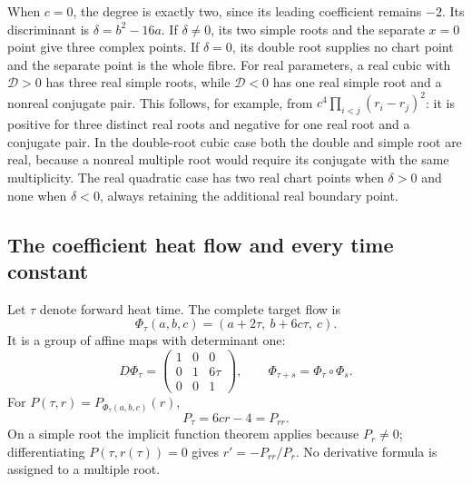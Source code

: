 When $c=0$, the degree is exactly two, since its leading coefficient
remains $-2$. Its discriminant is $\delta=b^2-16a$.
If $\delta\ne0$, its two simple roots and the separate $x=0$ point
give three complex points. If $\delta=0$, its double root supplies no
chart point and the separate point is the whole fibre.
For real parameters, a real cubic with $\mathscr D>0$ has three real
simple roots, while $\mathscr D<0$ has one real simple root and a
nonreal conjugate pair. This follows, for example, from
$c^4\prod_{i<j}(r_i-r_j)^2$: it is positive for three distinct real
roots and negative for one real root and a conjugate pair.
In the double-root cubic case both the double and simple root are real,
because a nonreal multiple root would require its conjugate with the
same multiplicity. The real quadratic case has two real chart points
when $\delta>0$ and none when $\delta<0$, always retaining the additional
real boundary point.

\subsection{The coefficient heat flow and every time constant}

Let $\tau$ denote forward heat time. The complete target flow is
\begin{equation}
 \Phi_\tau(a,b,c)=(a+2\tau,\ b+6c\tau,\ c).
 \label{eq:ifh-target-flow}
\end{equation}
It is a group of affine maps with determinant one:
\[
 D\Phi_\tau=
 \begin{pmatrix}1&0&0\\0&1&6\tau\\0&0&1\end{pmatrix},
 \qquad \Phi_{\tau+s}=\Phi_\tau\circ\Phi_s.
\]
For $P(\tau,r)=P_{\Phi_\tau(a,b,c)}(r)$,
\begin{equation}
 P_\tau=6cr-4=P_{rr}. \label{eq:ifh-heat}
\end{equation}
On a simple root the implicit function theorem applies because $P_r\ne0$;
differentiating $P(\tau,r(\tau))=0$ gives
$r'=-P_{rr}/P_r$. No derivative formula is assigned to a multiple root.

